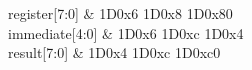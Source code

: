 \begin{tikztimingtable} [xscale=2.0]
	register[7:0] & 1D{0x6} 1D{0x8} 1D{0x80} \\
	immediate[4:0] & 1D{0x6} 1D{0xc} 1D{0x4} \\
	result[7:0] & 1D{0x4} 1D{0xc} 1D{0xc0} \\
\end{tikztimingtable}
